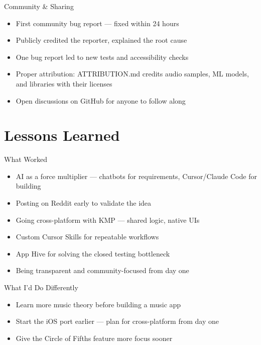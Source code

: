 \documentclass[aspectratio=169]{beamer}
\begin{document}
\begin{frame}{Community \& Sharing}
  \begin{itemize}
    \item First community bug report --- fixed within 24 hours
    \item Publicly credited the reporter, explained the root cause
    \item One bug report led to new tests and accessibility checks
    \item Proper attribution: ATTRIBUTION.md credits audio samples,
          ML models, and libraries with their licenses
    \item Open discussions on GitHub for anyone to follow along
  \end{itemize}
\end{frame}

\section{Lessons Learned}

\begin{frame}{What Worked}
  \begin{itemize}
    \item AI as a force multiplier --- chatbots for requirements, Cursor/Claude Code for building
    \item Posting on Reddit early to validate the idea
    \item Going cross-platform with KMP --- shared logic, native UIs
    \item Custom Cursor Skills for repeatable workflows
    \item App Hive for solving the closed testing bottleneck
    \item Being transparent and community-focused from day one
  \end{itemize}
\end{frame}

\begin{frame}{What I'd Do Differently}
  \begin{itemize}
    \item Learn more music theory before building a music app
    \item Start the iOS port earlier --- plan for cross-platform from day one
    \item Give the Circle of Fifths feature more focus sooner
  \end{itemize}
\end{frame}
\end{document}
